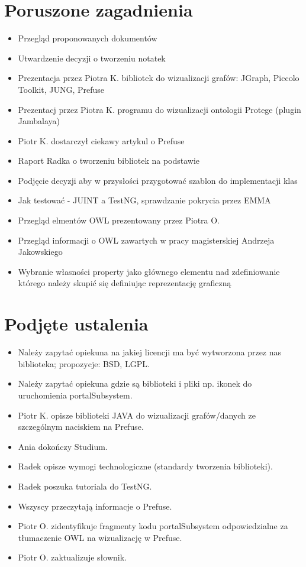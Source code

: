 \documentclass[a4paper,10pt]{article}
\begin{document}
\section{Poruszone zagadnienia}
\begin{itemize}
 	\item Przegląd proponowanych dokumentów
	\item Utwardzenie decyzji o tworzeniu notatek
	\item Prezentacja przez Piotra K. bibliotek do wizualizacji grafów: JGraph, Piccolo Toolkit, JUNG, Prefuse
	\item Prezentacj przez Piotra K. programu do wizualizacji ontologii Protege (plugin Jambalaya) 
	\item Piotr K. dostarczył ciekawy artykul o Prefuse 
	\item Raport Radka o tworzeniu bibliotek na podstawie  
	\item Podjęcie decyzji aby w przysłości przygotować szablon do implementacji klas
	\item Jak testować - JUINT a TestNG,  sprawdzanie pokrycia przez EMMA 
	\item  Przegląd elmentów OWL prezentowany przez Piotra O. 	
	\item Przegląd informacji o OWL zawartych w pracy magisterskiej Andrzeja Jakowskiego 
	\item Wybranie własności property jako głównego elementu nad zdefiniowanie którego należy skupić się definiując reprezentację graficzną
	   
\end{itemize}


\section{Podjęte ustalenia}
\begin{itemize}
 	\item Należy zapytać opiekuna na jakiej licencji ma być wytworzona przez nas biblioteka; propozycje: BSD, LGPL. 
	\item Należy zapytać opiekuna gdzie są biblioteki i pliki np. ikonek do uruchomienia portalSubsystem.
	\item Piotr K. opisze biblioteki JAVA do wizualizacji grafów/danych ze szczególnym naciskiem na Prefuse.
	\item Ania dokończy Studium.
	\item Radek opisze wymogi technologiczne (standardy tworzenia biblioteki).
	\item Radek poszuka tutoriala do TestNG.
	\item Wszyscy przeczytają informacje o Prefuse.
	\item Piotr O. zidentyfikuje fragmenty kodu portalSubsystem odpowiedzialne za tłumaczenie OWL na wizualizację w Prefuse.
	\item Piotr O. zaktualizuje słownik.
\end{itemize}
\end{document}
